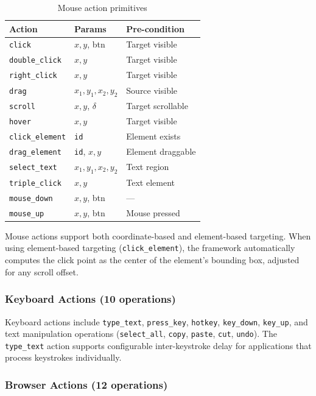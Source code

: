 \begin{table}[t]
\centering
\caption{Mouse action primitives}
\label{tab:mouse}
\begin{tabular}{@{}llp{2.8cm}@{}}
\toprule
\textbf{Action} & \textbf{Params} & \textbf{Pre-condition} \\
\midrule
\texttt{click} & $x, y$, btn & Target visible \\
\texttt{double\_click} & $x, y$ & Target visible \\
\texttt{right\_click} & $x, y$ & Target visible \\
\texttt{drag} & $x_1, y_1, x_2, y_2$ & Source visible \\
\texttt{scroll} & $x, y$, $\delta$ & Target scrollable \\
\texttt{hover} & $x, y$ & Target visible \\
\texttt{click\_element} & \texttt{id} & Element exists \\
\texttt{drag\_element} & \texttt{id}, $x, y$ & Element draggable \\
\texttt{select\_text} & $x_1, y_1, x_2, y_2$ & Text region \\
\texttt{triple\_click} & $x, y$ & Text element \\
\texttt{mouse\_down} & $x, y$, btn & --- \\
\texttt{mouse\_up} & $x, y$, btn & Mouse pressed \\
\bottomrule
\end{tabular}
\end{table}

Mouse actions support both coordinate-based and element-based targeting. When using element-based targeting (\texttt{click\_element}), the framework automatically computes the click point as the center of the element's bounding box, adjusted for any scroll offset.

\subsubsection{Keyboard Actions (10 operations)}

Keyboard actions include \texttt{type\_text}, \texttt{press\_key}, \texttt{hotkey}, \texttt{key\_down}, \texttt{key\_up}, and text manipulation operations (\texttt{select\_all}, \texttt{copy}, \texttt{paste}, \texttt{cut}, \texttt{undo}). The \texttt{type\_text} action supports configurable inter-keystroke delay for applications that process keystrokes individually.

\subsubsection{Browser Actions (12 operations)}

